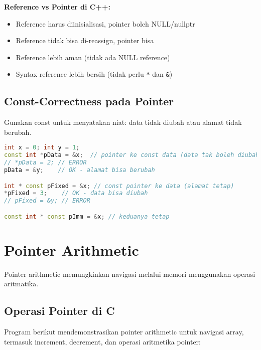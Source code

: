 \documentclass[../main.tex]{subfiles}
\begin{document}
\textbf{Reference vs Pointer di C++:}
\begin{itemize}
  \item Reference harus diinisialisasi, pointer boleh NULL/nullptr
  \item Reference tidak bisa di-reassign, pointer bisa
  \item Reference lebih aman (tidak ada NULL reference)
  \item Syntax reference lebih bersih (tidak perlu \texttt{*} dan \texttt{\&})
\end{itemize}

\subsection{Const-Correctness pada Pointer}
Gunakan const untuk menyatakan niat: data tidak diubah atau alamat tidak berubah.
\begin{lstlisting}[language=C++]
int x = 0; int y = 1;
const int *pData = &x;  // pointer ke const data (data tak boleh diubah lewat pData)
// *pData = 2; // ERROR
pData = &y;    // OK - alamat bisa berubah

int * const pFixed = &x; // const pointer ke data (alamat tetap)
*pFixed = 3;    // OK - data bisa diubah
// pFixed = &y; // ERROR

const int * const pImm = &x; // keduanya tetap
\end{lstlisting}

\section{Pointer Arithmetic}

Pointer arithmetic memungkinkan navigasi melalui memori menggunakan operasi aritmatika.

\subsection{Operasi Pointer di C}

Program berikut mendemonstrasikan pointer arithmetic untuk navigasi array, termasuk increment, decrement, dan operasi aritmetika pointer:
\end{document}
